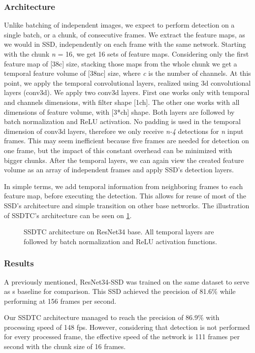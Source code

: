 \subsubsection{Architecture}
Unlike batching of independent images, we expect to perform detection on a single batch, or a chunk, of consecutive frames. We extract the feature maps, as we would in SSD, independently on each frame with the same network. Starting with the chunk \textit{n} = 16, we get 16 sets of feature maps. Considering only the first feature map of [38\x c] size, stacking those maps from the whole chunk we get a temporal feature volume of [38\x n\x c] size, where \textit{c} is the number of channels. At this point, we apply the temporal convolutional layers, realized using 3d convolutional layers (conv3d). We apply two conv3d layers. First one works only with temporal and channels dimensions, with filter shape [1\x ch].  The other one works with all dimensions of feature volume, with [3*ch] shape. Both layers are followed by batch normalization and ReLU activation. No padding is used in the temporal dimension of conv3d layers, therefore we only receive \textit{n-4} detections for \textit{n} input frames. This may seem inefficient because five frames are needed for detection on one frame, but the impact of this constant overhead can be minimized with bigger chunks. After the temporal layers, we can again view the created feature volume as an array of independent frames and apply SSD's detection layers. 

In simple terms, we add temporal information from neighboring frames to each feature map, before executing the detection. This allows for reuse of most of the SSD's architecture and simple transition on other base networks. The illustration of SSDTC's architecture can be seen on \cref{fig:ssdtc}.

\begin{figure}
    \centering
    \ssdtc
    \caption[Single Shot Detector with Temporal Convolution]{SSDTC architecture on ResNet34 base. All temporal layers are followed by batch normalization and ReLU activation functions.}
    \label{fig:ssdtc}
\end{figure}


\subsubsection{Results}
A previously mentioned, ResNet34-SSD was trained on the same dataset to serve as s baseline for comparison. This SSD achieved the precision of 81.6\% while performing at 156 frames per second. 

Our SSDTC architecture managed to reach the precision of 86.9\% with processing speed of 148 fps. However, considering that detection is not performed for every processed frame, the effective speed of the network is 111 frames per second with the chunk size of 16 frames. 
